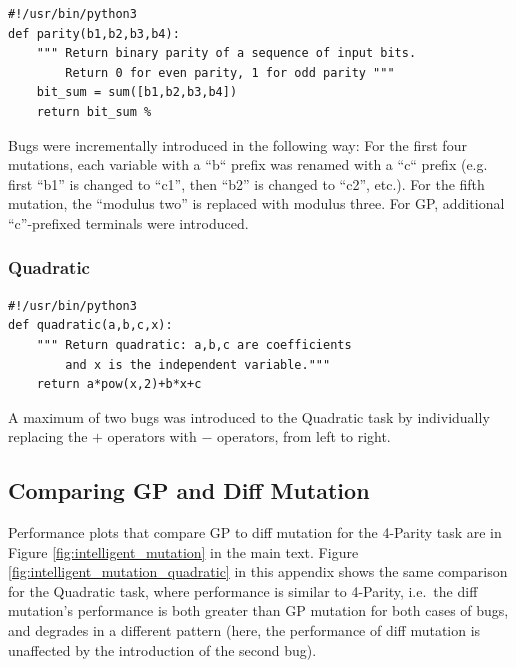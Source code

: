 \documentclass{article}
\begin{document}
\begin{verbatim}
#!/usr/bin/python3
def parity(b1,b2,b3,b4):
    """ Return binary parity of a sequence of input bits. 
        Return 0 for even parity, 1 for odd parity """
    bit_sum = sum([b1,b2,b3,b4])
    return bit_sum %
\end{verbatim}

Bugs were incrementally introduced in the following way: For the first four mutations, each variable with a ``b`` prefix was renamed with a ``c`` prefix (e.g. first ``b1'' is changed to ``c1'', then ``b2'' is changed to ``c2'', etc.). For the fifth mutation, the ``modulus two'' is replaced with modulus three. For GP, additional ``c''-prefixed terminals were introduced. 

\subsubsection{Quadratic}

\begin{verbatim}
#!/usr/bin/python3
def quadratic(a,b,c,x):
    """ Return quadratic: a,b,c are coefficients 
        and x is the independent variable."""
    return a*pow(x,2)+b*x+c
\end{verbatim}

A maximum of two bugs was introduced to the Quadratic task by individually replacing the $+$ operators with $-$ operators, from left to right. 

\subsection{Comparing GP and Diff Mutation}

Performance plots that compare GP to diff mutation for the 4-Parity task are in Figure \ref{fig:intelligent_mutation} in the main text. Figure \ref{fig:intelligent_mutation_quadratic} in this appendix shows the same comparison for the Quadratic task, where performance is similar to 4-Parity, i.e.\ the diff mutation's performance is both greater than GP mutation for both cases of bugs, and degrades in a different pattern (here, the performance of diff mutation is unaffected by the introduction of the second bug).
\end{document}
